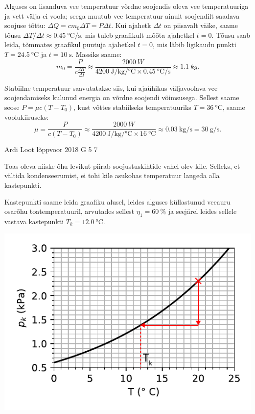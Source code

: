 \documentclass[11pt, twoside]{article}
\begin{document}
{{\ifSolution
Alguses on lisanduva vee temperatuur võrdne soojendis oleva vee temperatuuriga ja vett välja ei voola; seega muutub vee temperatuur ainult soojendilt saadava soojuse tõttu: $\Delta Q = c m_0 \Delta T = P \Delta t$. Kui ajahetk $\Delta t$ on piisavalt väike, saame tõusu $\Delta T / \Delta t \approx \SI{0,45}{\celsius\per\second}$, mis tuleb graafikult mõõta ajahetkel $t=0$. Tõusu saab leida, tõmmates graafikul puutuja ajahetkel $t=0$, mis läbib ligikaudu punkti $T=\SI{24.5}{\celsius}$ ja $t = \SI{10}{\second}$. Massiks saame:
$$m_0 = \frac{P}{c \frac{\Delta T}{\Delta t}} \approx \frac{\SI{2000}{W}}{\SI{4200}{\joule \per \kilogram \per \celsius}\times\SI{0,45}{\celsius\per\second}} \approx \SI{1.1}{kg}.$$

Stabiilne temperatuur saavutatakse siis, kui ajaühikus väljavoolava vee soojendamiseks kulunud energia on võrdne soojendi võimsusega. Sellest saame seose $P=\mu c(T-T_0)$, kust võttes stabiilseks temperatuuriks $T=\SI{36}{\celsius}$, saame voolukiiruseks:
$$\mu = \frac{P}{c(T-T_0)} \approx \frac{\SI{2000}{W}}{\SI{4200}{\joule \per \kilogram \per\celsius}\times \SI{16}{\celsius}} \approx \SI{0.03}{\kilogram\per\second}=\SI{30}{\gram\per\second}.$$
\fi
}

{Ardi Loot} %
{lõppvoor} %
{2018} %
{G 5} %
{7} %
{

\ifSolution
Toas oleva niiske õhu levikut piirab soojustuskihtide vahel olev kile.
Selleks, et vältida kondenseerumist, ei tohi kile asukohas temperatuur
langeda alla kastepunkti. 

Kastepunkti saame leida graafiku alusel, leides alguses küllastunud
veeauru osarõhu toatemperatuuril, arvutades sellest $\eta_{1}=\SI{60}{\percent}$
ja seejärel leides sellele vastava kastepunkti $T_{k}=\SI{12.0}{\celsius}.$
\begin{center}
\includegraphics[scale=0.9]{2018-v3g-05-kullastunud-aur-lah}
\par\end{center}

}}
\end{document}
